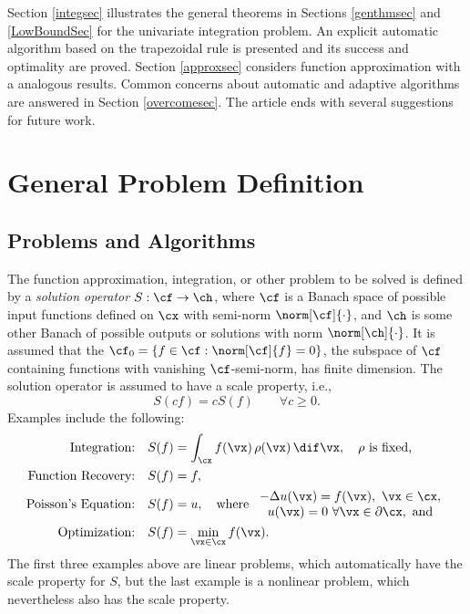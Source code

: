 \documentclass[]{elsarticle}
\theoremstyle{definition}
\theoremstyle{remark}
\begin{document}
Section \ref{integsec} illustrates the general theorems in Sections \ref{genthmsec} and \ref{LowBoundSec} for the univariate integration problem.  An explicit automatic algorithm based on the trapezoidal rule is presented and its success and optimality are proved.  Section \ref{approxsec}  considers function approximation with a analogous results.  Common concerns about automatic and adaptive algorithms are answered in Section \ref{overcomesec}. The article ends with several suggestions for future work.

\section{General Problem Definition} \label{probdefsec}

\subsection{Problems and Algorithms} The function approximation, integration, or other problem to be solved is defined by a \emph{solution operator} $S:\cf \to \ch$, where $\cf$ is a Banach space of possible input functions defined on $\cx$ with semi-norm $\norm[\cf]{\cdot}$, and $\ch$ is some other Banach of possible outputs or solutions with norm $\norm[\ch]{\cdot}$. It is assumed that the $\cf_0 = \{f \in \cf :  \norm[\cf]{f}=0\}$, the subspace of $\cf$ containing functions with vanishing $\cf$-semi-norm, has finite dimension. The solution operator is assumed to have a scale property, i.e., 
\[
S(cf) = cS(f) \qquad \forall c\ge 0.
\]
Examples include the following:
\begin{align*}
\text{Integration:} \quad & S(f) = \int_{\cx} f(\vx) \, \rho(\vx) \, \dif \vx, \quad \rho \text{ is fixed,}\\
\text{Function Recovery:} \quad & S(f) = f, \\
\text{Poisson's Equation:} \quad & S(f) = u, \quad \text{where } \begin{array}{c} -\Delta u(\vx) = f(\vx), \ \vx \in \cx, \\ u(\vx)=0 \ \forall \vx \in \partial \cx, \text{ and}\end{array} \\
\text{Optimization:} \quad & S(f) = \min_{\vx \in \cx} f(\vx).
\end{align*}
The first three examples above are linear problems, which automatically have the scale property for $S$, but the last example is a nonlinear problem, which nevertheless also has the scale property.
\end{document}
